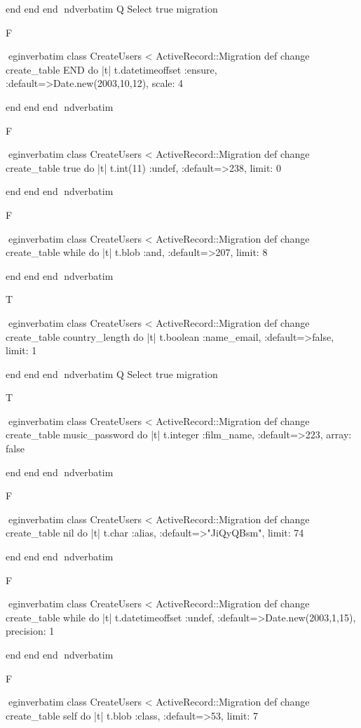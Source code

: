     end 
  end 
end
nd{verbatim}
Q
 Select true migration

F

egin{verbatim}
 class CreateUsers < ActiveRecord::Migration 
  def change 
    create_table END do |t| 
      t.datetimeoffset :ensure, :default=>Date.new(2003,10,12), scale: 4
    
    end 
  end 
end
nd{verbatim}

F

egin{verbatim}
 class CreateUsers < ActiveRecord::Migration 
  def change 
    create_table true do |t| 
      t.int(11) :undef, :default=>238, limit: 0
    
    end 
  end 
end
nd{verbatim}

F

egin{verbatim}
 class CreateUsers < ActiveRecord::Migration 
  def change 
    create_table while do |t| 
      t.blob :and, :default=>207, limit: 8
    
    end 
  end 
end
nd{verbatim}

T

egin{verbatim}
 class CreateUsers < ActiveRecord::Migration 
  def change 
    create_table country_length do |t| 
      t.boolean :name_email, :default=>false, limit: 1
    
    end 
  end 
end
nd{verbatim}
Q
 Select true migration

T

egin{verbatim}
 class CreateUsers < ActiveRecord::Migration 
  def change 
    create_table music_password do |t| 
      t.integer :film_name, :default=>223, array: false
    
    end 
  end 
end
nd{verbatim}

F

egin{verbatim}
 class CreateUsers < ActiveRecord::Migration 
  def change 
    create_table nil do |t| 
      t.char :alias, :default=>"JiQyQBsm", limit: 74
    
    end 
  end 
end
nd{verbatim}

F

egin{verbatim}
 class CreateUsers < ActiveRecord::Migration 
  def change 
    create_table while do |t| 
      t.datetimeoffset :undef, :default=>Date.new(2003,1,15), precision: 1
    
    end 
  end 
end
nd{verbatim}

F

egin{verbatim}
 class CreateUsers < ActiveRecord::Migration 
  def change 
    create_table self do |t| 
      t.blob :class, :default=>53, limit: 7
    
